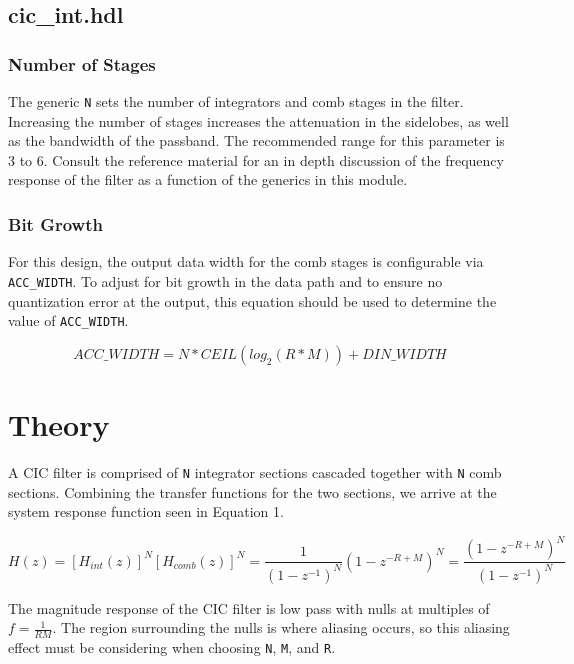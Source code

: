 \documentclass{article}
\def\comp{cic\_int}
\begin{document}
\subsection*{\comp.hdl}
\subsubsection*{Number of Stages}
\begin{flushleft}
	The generic \verb+N+ sets the number of integrators and comb stages in the filter.	Increasing the number of stages increases the attenuation in the sidelobes, as well as the bandwidth of the passband. The recommended range for this parameter is 3 to 6. Consult the reference material for an in depth discussion of the frequency response of the filter as a function of the generics in this module.
\end{flushleft}
\subsubsection*{Bit Growth}
\begin{flushleft}
	For this design, the output data width for the comb stages is configurable via	\verb+ACC_WIDTH+. To adjust for bit growth in the data path and to ensure no quantization error at the output, this equation should be used to determine the value of \verb+ACC_WIDTH+.

	\begin{equation} \label{eq:acc_width}
		ACC\_WIDTH = N*CEIL(log_2(R*M))+DIN\_WIDTH
	\end{equation}
\end{flushleft}

\section*{Theory}
\begin{flushleft}
	A CIC filter is comprised of \verb+N+ integrator sections cascaded together with \verb+N+ comb sections. Combining the transfer functions for the two sections, we arrive at the system response function seen in Equation 1.

	\begin{equation} \label{eq:response_function}
		H(z) = [H_{int}(z)]^N[H_{comb}(z)]^N = \frac{1}{(1-z^{-1})^N}(1-z^{-R+M})^N = 	\frac{(1 - z^{-R+M})^N}{(1-z^{-1})^N}
	\end{equation}

	The magnitude response of the CIC filter is low pass with nulls at multiples of $f=\frac{1}{RM}$. The region surrounding the nulls is where aliasing occurs, so 	this aliasing effect must be considering when choosing \verb+N+, \verb+M+, and \verb+R+.
\end{flushleft}
\end{document}
